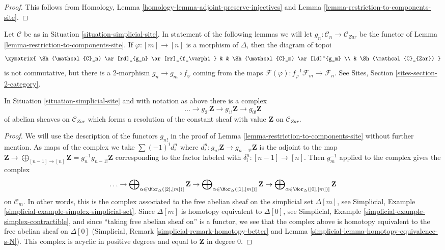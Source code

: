 \begin{proof}
This follows from
Homology, Lemma \ref{homology-lemma-adjoint-preserve-injectives}
and
Lemma \ref{lemma-restriction-to-components-site}.
\end{proof}

\noindent
Let $\mathcal{C}$ be as in Situation \ref{situation-simplicial-site}.
In statement of the following lemmas we will let
$g_n : \mathcal{C}_n \to \mathcal{C}_{Zar}$ be the functor of
Lemma \ref{lemma-restriction-to-components-site}. If $\varphi : [m] \to [n]$
is a morphism of $\Delta$, then the diagram of topoi
$$
\xymatrix{
\Sh(\mathcal{C}_n) \ar[rd]_{g_n} \ar[rr]_{f_\varphi} & &
\Sh(\mathcal{C}_m) \ar[ld]^{g_m} \\
& \Sh(\mathcal{C}_{Zar})
}
$$
is not commutative, but there is a $2$-morphism $g_n \to g_m \circ f_\varphi$
coming from the maps
$\mathcal{F}(\varphi) : f_\varphi^{-1}\mathcal{F}_m \to \mathcal{F}_n$.
See Sites, Section \ref{sites-section-2-category}.

\begin{lemma}
\label{lemma-simplicial-resolution-Z-site}
In Situation \ref{situation-simplicial-site} and with notation as above
there is a complex
$$
\ldots \to g_{2!}\mathbf{Z} \to g_{1!}\mathbf{Z} \to g_{0!}\mathbf{Z}
$$
of abelian sheaves on $\mathcal{C}_{Zar}$ which forms a resolution of
the constant sheaf with value $\mathbf{Z}$ on $\mathcal{C}_{Zar}$.
\end{lemma}

\begin{proof}
We will use the description of the functors $g_{n!}$ in the proof of
Lemma \ref{lemma-restriction-to-components-site} without further mention.
As maps of the complex we take $\sum (-1)^i d^n_i$ where
$d^n_i : g_{n!}\mathbf{Z} \to g_{n - 1!}\mathbf{Z}$ is the
adjoint to the map $\mathbf{Z} \to
\bigoplus_{[n - 1] \to [n]} \mathbf{Z} = g_n^{-1}g_{n - 1!}\mathbf{Z}$
corresponding to the factor labeled with $\delta^n_i : [n - 1] \to [n]$.
Then $g_m^{-1}$ applied to the complex gives the complex
$$
\ldots \to
\bigoplus\nolimits_{\alpha \in \Mor_\Delta([2], [m])]} \mathbf{Z} \to
\bigoplus\nolimits_{\alpha \in \Mor_\Delta([1], [m])]} \mathbf{Z} \to
\bigoplus\nolimits_{\alpha \in \Mor_\Delta([0], [m])]} \mathbf{Z}
$$
on $\mathcal{C}_m$.
In other words, this is the complex associated to the
free abelian sheaf on the simplicial set $\Delta[m]$, see
Simplicial, Example \ref{simplicial-example-simplex-simplicial-set}.
Since $\Delta[m]$ is homotopy equivalent to $\Delta[0]$, see
Simplicial, Example \ref{simplicial-example-simplex-contractible},
and since ``taking free abelian sheaf on'' is a functor,
we see that the complex above is homotopy equivalent to
the free abelian sheaf on $\Delta[0]$
(Simplicial, Remark \ref{simplicial-remark-homotopy-better} and
Lemma \ref{simplicial-lemma-homotopy-equivalence-s-N}).
This complex is acyclic in positive degrees
and equal to $\mathbf{Z}$ in degree $0$.
\end{proof}

